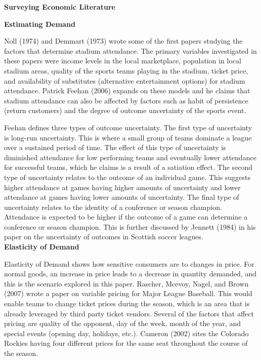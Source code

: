 \documentclass[preprint,12pt,times]{elsarticle}
\begin{document}
\begin{large}
\noindent\textbf{Surveying Economic Literature}
\end{large}

\noindent\textbf{Estimating Demand}

Noll (1974) and Demmart (1973) wrote some of the first papers studying the factors that determine stadium attendance.  The primary variables investigated in these papers were income levels in the local marketplace, population in local stadium areas, quality of the sports teams playing in the stadium, ticket price, and availability of substitutes (alternative entertainment options) for stadium attendance.  Patrick Feehan (2006) expands on these models and he claims that stadium attendance can also be affected by factors such as habit of persistence (return customers) and the degree of outcome uncertainty of the sports event.

Feehan defines three types of outcome uncertainty.  The first type of uncertainty is long-run uncertainty.  This is where a small group of teams dominate a league over a sustained period of time.  The effect of this type of uncertainty is diminished attendance for low performing teams and eventually lower attendance for successful teams, which he claims is a result of a satiation effect.  The second type of uncertainty relates to the outcome of an individual game.  This suggests higher attendance at games having higher amounts of uncertainty and lower attendance at games having lower amounts of uncertainty. The final type of uncertainty relates to the identity of a conference or season champion.  Attendance is expected to be higher if the outcome of a game can determine a conference or season champion.  This is further discussed by Jennett (1984) in his paper on the uncertainty of outcomes in Scottish soccer leagues.\\

\noindent
\textbf{Elasticity of Demand}

Elasticity of Demand shows how sensitive consumers are to changes in price.  For normal goods, an increase in price leads to a decrease in quantity demanded, and this is the scenario explored in this paper.  Rascher, Mcevoy, Nagel, and Brown (2007) wrote a paper on variable pricing for Major League Baseball.  This would enable teams to change ticket prices during the season, which is an area that is already leveraged by third party ticket vendors.  Several of the factors that affect pricing are quality of the opponent, day of the week, month of the year, and special events (opening day, holidays, etc.).  Cameron (2002) sites the Colorado Rockies having four different prices for the same seat throughout the course of the season.
\end{document}
